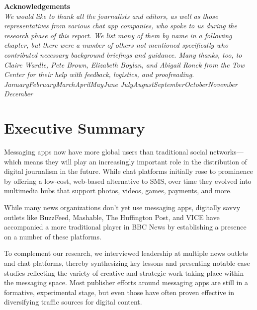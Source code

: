\documentclass[notoc, symmetric, nobib, nols]{towcenter-guideto-book}
\newcommand{\monthyear}{%
  \ifcase\month\or January\or February\or March\or April\or May\or June\or
  July\or August\or September\or October\or November\or
  December\fi\space\number\year
}
\newcommand{\blankpage}{\newpage\hbox{}\thispagestyle{empty}\newpage}
\begin{document}
\blankpage
\blankpage


\null
\begin{fullwidth}
\noindent\textsf{\textbf{Acknowledgements}} \\[0.3cm]
\noindent\textit{We would like to thank all the journalists and editors, as well as those representatives from various chat app companies, who spoke to us during the research phase of this report. We list many of them by name in a following chapter, but there were a number of others not mentioned specifically who contributed necessary background briefings and guidance. Many thanks, too, to Claire Wardle, Pete Brown, Elizabeth Boylan, and Abigail Ronck from the Tow Center for their help with feedback, logistics, and proofreading.
}\\[0.1cm]
\noindent\textit{\monthyear}
\end{fullwidth}
\tableofcontents


\cleardoublepage


\mainmatter


\chapter{Executive Summary}
\blankpage

Messaging apps now have more global users than traditional social networks---which means they will play an increasingly important role in the distribution of digital journalism in the future. While chat platforms initially rose to prominence by offering a low-cost, web-based alternative to SMS, over time they evolved into multimedia hubs that support photos, videos, games, payments, and more.

While many news organizations don't yet use messaging apps, digitally savvy outlets like BuzzFeed, Mashable, The Huffington Post, and VICE have accompanied a more traditional player in BBC News by establishing a presence on a number of these platforms.


To complement our research, we interviewed leadership at multiple news outlets and chat platforms, thereby synthesizing key lessons and presenting notable case studies reflecting the variety of creative and strategic work taking place within the messaging space. Most publisher efforts around messaging apps are still in a formative, experimental stage, but even those have often proven effective in diversifying traffic sources for digital content.  
\end{document}
